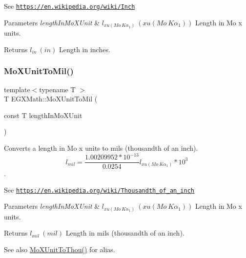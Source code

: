 See \href{https://en.wikipedia.org/wiki/Inch}{\tt https\+://en.\+wikipedia.\+org/wiki/\+Inch} 
\begin{DoxyParams}{Parameters}
{\em length\+In\+Mo\+X\+Unit} & $ l_{xu(Mo\ K\alpha_1)}\ (xu(Mo\ K\alpha_1))$ Length in Mo x units. \\
\hline
\end{DoxyParams}
\begin{DoxyReturn}{Returns}
$ l_{in}\ (in)$ Length in inches. 
\end{DoxyReturn}
\mbox{\label{group___e_g_x_math-_conversions-_length_conversions-_non-_s_i-_mo_x_unit-_imperial_gaa73c49ecabd4f9db771fac592ff7449a}} 
\subsubsection{\texorpdfstring{Mo\+X\+Unit\+To\+Mil()}{MoXUnitToMil()}}
{\footnotesize\ttfamily template$<$typename T $>$ \\
T E\+G\+X\+Math\+::\+Mo\+X\+Unit\+To\+Mil (\begin{DoxyParamCaption}\item[{const T}]{length\+In\+Mo\+X\+Unit }\end{DoxyParamCaption})}



Converts a length in Mo x units to mils (thousandth of an inch). \[ l_{mil}= \frac{1.00209952*10^{-13}}{0.0254} l_{xu(Mo\ K\alpha_1)} * 10^{3} \]. 

See \href{https://en.wikipedia.org/wiki/Thousandth_of_an_inch}{\tt https\+://en.\+wikipedia.\+org/wiki/\+Thousandth\+\_\+of\+\_\+an\+\_\+inch} 
\begin{DoxyParams}{Parameters}
{\em length\+In\+Mo\+X\+Unit} & $ l_{xu(Mo\ K\alpha_1)}\ (xu(Mo\ K\alpha_1))$ Length in Mo x units. \\
\hline
\end{DoxyParams}
\begin{DoxyReturn}{Returns}
$ l_{mil}\ (mil)$ Length in mils (thousandth of an inch). 
\end{DoxyReturn}
\begin{DoxySeeAlso}{See also}
\mbox{\hyperlink{group___e_g_x_math-_conversions-_length_conversions-_non-_s_i-_mo_x_unit-_imperial_gae18fc1fb7d5238fe185b85084b95b2b0}{Mo\+X\+Unit\+To\+Thou()}} for alias. 
\end{DoxySeeAlso}
\mbox{\label{group___e_g_x_math-_conversions-_length_conversions-_non-_s_i-_mo_x_unit-_imperial_gabfdb228f43e8988c62daac3d6e71d7fa}} 
